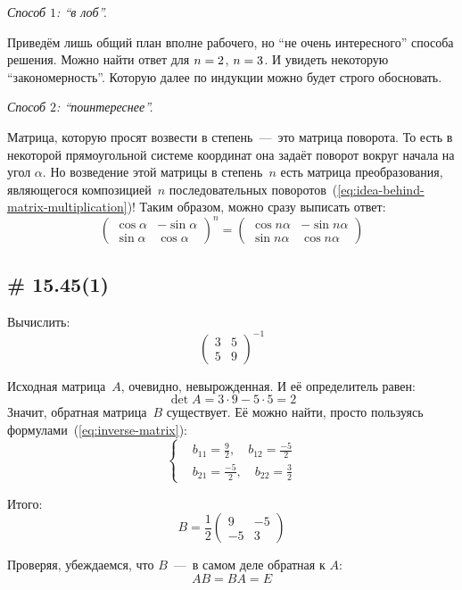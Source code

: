 \documentclass[a4paper,12pt]{article}
\theoremstyle{remark}
\begin{document}
  \begin{solution}
    \leavevmode
    
    \emph{Способ $1$: ``в лоб''.}
    
    Приведём лишь общий план вполне рабочего, но ``не очень интересного'' способа решения.
    Можно найти ответ для $n \hm= 2$, $n \hm= 3$.
    И увидеть некоторую ``закономерность''.
    Которую далее по индукции можно будет строго обосновать.
    
    \medskip
    
    \emph{Способ $2$: ``поинтереснее''.}
    
    Матрица, которую просят возвести в степень~---~это матрица поворота.
    То есть в некоторой прямоугольной системе координат она задаёт поворот вокруг начала на угол $\alpha$.
    Но возведение этой матрицы в степень~$n$ есть матрица преобразования, являющегося композицией~$n$ последовательных поворотов~(\ref{eq:idea-behind-matrix-multiplication})!
    Таким образом, можно сразу выписать ответ:
    \[
      \begin{pmatrix}
        \cos \alpha & -\sin \alpha\\
        \sin \alpha & \cos \alpha
      \end{pmatrix}^n
      = \begin{pmatrix}
        \cos n\alpha & -\sin n\alpha\\
        \sin n\alpha & \cos n\alpha
      \end{pmatrix}
    \]
  \end{solution}
  
  
  \subsection{\# 15.45(1)}
  
  Вычислить:
  \[
    \begin{pmatrix}
      3 & 5\\
      5 & 9
    \end{pmatrix}^{-1}
  \]
  
  \begin{solution}
    Исходная матрица~$A$, очевидно, невырожденная.
    И её определитель равен:
    \[
      \det A = 3 \cdot 9 - 5 \cdot 5 = 2
    \]
    Значит, обратная матрица~$B$ существует.
    Её можно найти, просто пользуясь формулами~(\ref{eq:inverse-matrix}):
    \[
      \left\{
        \begin{aligned}
          &b_{11} = \frac{9}{2},\quad b_{12} = \frac{-5}{2}\\
          &b_{21} = \frac{-5}{2},\quad b_{22} = \frac{3}{2}
        \end{aligned}
      \right.
    \]
    
    Итого:
    \[
      B = \frac{1}{2} \begin{pmatrix}
        9 & -5\\
        -5 & 3
      \end{pmatrix}
    \]
    
    Проверяя, убеждаемся, что $B$~---~в самом деле обратная к $A$:
    \[
      AB = BA = E
    \]
  \end{solution}
  
\end{document}
